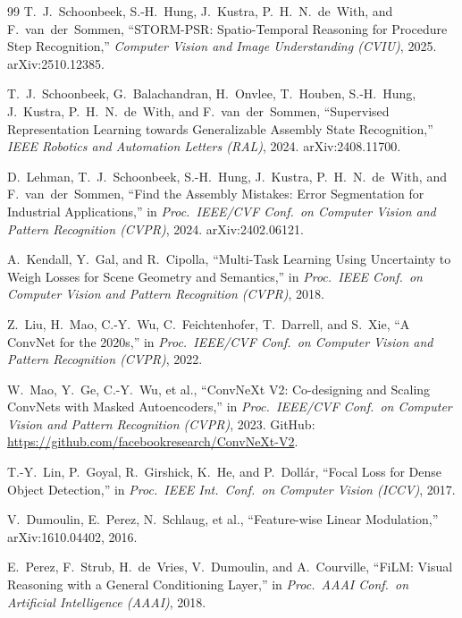 \documentclass[11pt,a4paper]{article}
\begin{document}
\begin{thebibliography}{99}
T.~J.~Schoonbeek, S.-H.~Hung, J.~Kustra, P.~H.~N.~de~With, and F.~van~der~Sommen,
``STORM-PSR: Spatio-Temporal Reasoning for Procedure Step Recognition,''
\textit{Computer Vision and Image Understanding (CVIU)}, 2025.
arXiv:2510.12385.

T.~J.~Schoonbeek, G.~Balachandran, H.~Onvlee, T.~Houben, S.-H.~Hung, J.~Kustra,
P.~H.~N.~de~With, and F.~van~der~Sommen,
``Supervised Representation Learning towards Generalizable Assembly State Recognition,''
\textit{IEEE Robotics and Automation Letters (RAL)}, 2024.
arXiv:2408.11700.

D.~Lehman, T.~J.~Schoonbeek, S.-H.~Hung, J.~Kustra, P.~H.~N.~de~With, and F.~van~der~Sommen,
``Find the Assembly Mistakes: Error Segmentation for Industrial Applications,''
in \emph{Proc.\ IEEE/CVF Conf.\ on Computer Vision and Pattern Recognition (CVPR)}, 2024.
arXiv:2402.06121.

A.~Kendall, Y.~Gal, and R.~Cipolla,
``Multi-Task Learning Using Uncertainty to Weigh Losses for Scene Geometry and Semantics,''
in \emph{Proc.\ IEEE Conf.\ on Computer Vision and Pattern Recognition (CVPR)}, 2018.

Z.~Liu, H.~Mao, C.-Y.~Wu, C.~Feichtenhofer, T.~Darrell, and S.~Xie,
``A ConvNet for the 2020s,''
in \emph{Proc.\ IEEE/CVF Conf.\ on Computer Vision and Pattern Recognition (CVPR)}, 2022.

W.~Mao, Y.~Ge, C.-Y.~Wu, et al.,
``ConvNeXt V2: Co-designing and Scaling ConvNets with Masked Autoencoders,''
in \emph{Proc.\ IEEE/CVF Conf.\ on Computer Vision and Pattern Recognition (CVPR)}, 2023.
GitHub: \url{https://github.com/facebookresearch/ConvNeXt-V2}.

T.-Y.~Lin, P.~Goyal, R.~Girshick, K.~He, and P.~Doll\'ar,
``Focal Loss for Dense Object Detection,''
in \emph{Proc.\ IEEE Int.\ Conf.\ on Computer Vision (ICCV)}, 2017.

V.~Dumoulin, E.~Perez, N.~Schlaug, et al.,
``Feature-wise Linear Modulation,''
arXiv:1610.04402, 2016.

E.~Perez, F.~Strub, H.~de~Vries, V.~Dumoulin, and A.~Courville,
``FiLM: Visual Reasoning with a General Conditioning Layer,''
in \emph{Proc.\ AAAI Conf.\ on Artificial Intelligence (AAAI)}, 2018.


\end{thebibliography}
\end{document}
